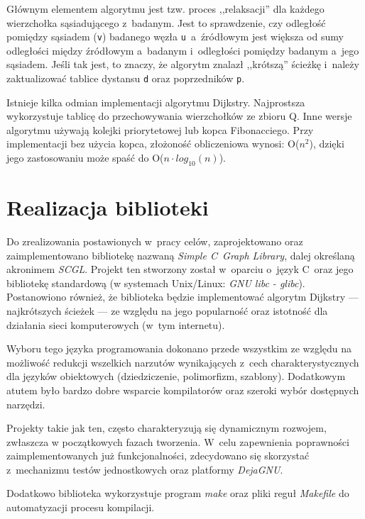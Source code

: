 \documentclass[a4paper,12pt,polish,twoside,openright]{thesis}
\newcommand\code[1]{\lstinline[style=line]{#1}}
\begin{document}
Głównym elementem algorytmu jest tzw. proces ,,relaksacji'' dla każdego wierzchołka sąsiadującego z~badanym.
Jest to sprawdzenie, czy odległość pomiędzy sąsiadem (\code{v}) badanego węzła \code{u}~a~źródłowym jest większa od sumy odległości między źródłowym a~badanym i~odległości pomiędzy badanym a~jego sąsiadem.
Jeśli tak jest, to znaczy, że algorytm znalazł ,,krótszą'' ścieżkę i~należy zaktualizować tablice dystansu \code{d} oraz poprzedników \code{p}.

Istnieje kilka odmian implementacji algorytmu Dijkstry.
Najprostsza wykorzystuje tablicę do przechowywania wierzchołków ze zbioru Q.
Inne wersje algorytmu używają kolejki priorytetowej lub kopca Fibonacciego.
Przy implementacji bez użycia kopca, złożoność obliczeniowa wynosi: O($n^2$), dzięki jego zastosowaniu może spaść do O($n \cdot log_{10}(n)$)\cite{graphtheory2}.


\chapter{Realizacja biblioteki}
Do zrealizowania postawionych w~pracy celów, zaprojektowano oraz zaimplementowano bibliotekę nazwaną \emph{Simple C~Graph Library}, dalej określaną akronimem \emph{SCGL}.
Projekt ten stworzony został w~oparciu o~język C~oraz jego bibliotekę standardową (w systemach Unix/Linux: \emph{GNU libc - glibc}).
Postanowiono również, że biblioteka będzie implementować algorytm Dijkstry --- najkrótszych ścieżek --- ze względu na jego popularność oraz istotność dla działania sieci komputerowych (w~tym internetu).

Wyboru tego języka programowania dokonano przede wszystkim ze względu na możliwość redukcji wszelkich narzutów wynikających z~cech charakterystycznych dla języków obiektowych (dziedziczenie, polimorfizm, szablony).
Dodatkowym atutem było bardzo dobre wsparcie kompilatorów oraz szeroki wybór dostępnych narzędzi.

Projekty takie jak ten, często charakteryzują się dynamicznym rozwojem, zwłaszcza w początkowych fazach tworzenia.
W~celu zapewnienia poprawności zaimplementowanych już funkcjonalności, zdecydowano się skorzystać z~mechanizmu testów jednostkowych oraz platformy \emph{DejaGNU}.

Dodatkowo biblioteka wykorzystuje program \emph{make} oraz pliki reguł \emph{Makefile} do automatyzacji procesu kompilacji.
\end{document}
